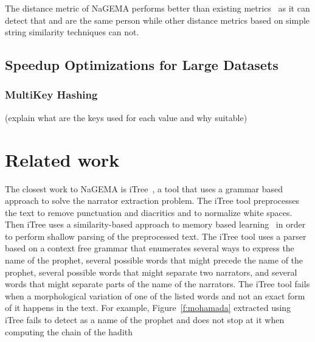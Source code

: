 \documentclass[11pt]{article}
\begin{document}
The distance metric of NaGEMA performs better than       
existing metrics~\cite{Azmi-2010} as it can detect that  
 and  are the same person
while other distance metrics based on simple
string similarity techniques can not. 

\subsection{Speedup Optimizations for Large Datasets}

\subsubsection{MultiKey Hashing}

(explain what are the keys used for each value and why suitable)


\section{Related work }
\label{sec:related}


The closest work to NaGEMA is 
iTree~\cite{Azmi-2010,iTree}, a 
tool that uses a grammar based approach to solve 
the narrator extraction problem. 
The iTree tool preprocesses the text to remove 
punctuation and diacritics and to normalize white
spaces. 
Then iTree uses a similarity-based approach
to memory based learning~\cite{Azmi-2010} 
in order to perform 
shallow parsing of the preprocessed text. 
The iTree tool uses a parser based on a context
free grammar that enumerates several ways to express
the name of the prophet, several possible words that 
might precede the name of the prophet, several possible
words that might separate two narrators, and several
words that might separate parts of the name of 
the narrators.
The iTree tool fails when a morphological variation of 
one of the 
listed words and not an exact form of it
happens in the text. 
For example, Figure~\ref{f:mohamada} extracted 
using iTree fails to detect  as a name of the
prophet and does not stop at it when computing the chain 
of the hadith
\transfalse
{}
\transtrue
\vocalize
\end{document}
